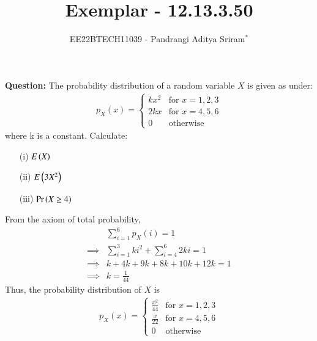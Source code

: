 \documentclass[journal,24pt,onecolumn]{IEEEtran}
\theoremstyle{remark}
\begin{document}

\vspace{3cm}

\title{Exemplar - 12.13.3.50}
\author{EE22BTECH11039 - Pandrangi Aditya Sriram$^{*}$%
}
\maketitle
\newpage
\bigskip

\renewcommand{\thefigure}{\theenumi}
\renewcommand{\thetable}{\theenumi}


\vspace{3cm}
\textbf{Question:} The probability distribution of a random variable $X$ is given as under:
\begin{align*}
    p_X(x) =
    \begin{cases}
        kx^2 &\text{for } x = 1,2,3\\
        2kx &\text{for } x = 4,5,6\\
        0 & \text{otherwise}
    \end{cases}
\end{align*}
where k is a constant. Calculate:
\begin{enumerate}
    \item[(i)] $E\left(X\right)$
    \item[(ii)] $E\left(3X^2\right)$
    \item[(iii)] $\Pr\left(X \geq 4\right)$
\end{enumerate}
\solution
From the axiom of total probability,
\begin{align}
    &\sum_{i = 1}^{6} p_X(i) = 1\\
    \implies &\sum_{i = 1}^{3} ki^2 + \sum_{i = 4}^{6} 2ki = 1\\
    \implies &k + 4k + 9k + 8k + 10k + 12k = 1\\
    \implies &k = \frac{1}{44}
\end{align}
Thus, the probability distribution of $X$ is 
\begin{align*}
    p_X(x) =
    \begin{cases}
        \frac{x^2}{44} &\text{for } x = 1,2,3\\
        \frac{x}{22} &\text{for } x = 4,5,6\\
        0 & \text{otherwise}
    \end{cases}
\end{align*}
\end{document}
